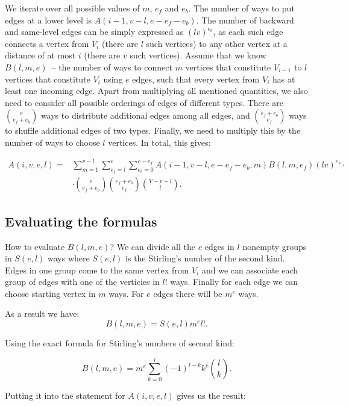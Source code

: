 \documentclass{llncs}
\begin{document}
  We iterate over all possible values of $m$, $e_f$ and $e_b$. The number of ways to put edges at a lower level
  is $A(i-1, v-l, e-e_f-e_b)$. The number of backward and same-level edges can be simply expressed as $(lv)^{e_b}$,
  as each such edge connects a vertex from $V_i$ (there are $l$ such vertices) to any other vertex at a distance of at 
  most $i$ (there are $v$ such vertices).
  Assume that we know $B(l,m,e)$~-- the number of ways to connect $m$ vertices that constitute $V_{i-1}$ to $l$ 
  vertices that constitute $V_i$ using $e$ edges, such that every vertex from $V_i$ has at least one incoming edge.
  Apart from multiplying all mentioned quantities, we also need to consider all possible orderings of edges of 
  different types. There are $\binom{e}{e_f + e_b}$ ways to distribute additional edges among all edges, and
  $\binom{e_f + e_b}{e_f}$ ways to shuffle additional edges of two types. Finally, we need to multiply this
  by the number of ways to choose $l$ vertices.
  In total, this gives:
  
  \begin{align*}
  A(i,v,e,l)  = & \sum_{m = 1}^{v - l} \sum_{e_f = l}^{e} \sum_{e_b = 0}^{e - e_f} A(i - 1, v - l, e - e_f - e_b, m) B(l, m, e_f) (l v)^{e_b} \cdot \\ 
  & \cdot \binom{e}{e_f + e_b} \binom{e_f + e_b}{e_f} \binom{V - v + l}{l}.
  \end{align*} 
  
  \subsection{Evaluating the formulas}
  
  How to evaluate $B(l,m,e)$? We can divide all the $e$ edges in $l$ nonempty groups in $S(e, l)$ ways where $S(e, l)$ is the Stirling's number of the second kind. Edges in one group come to the same vertex from $V_i$ and we can associate each group of edges with one of the verticies in $l!$ ways. Finally for each edge we can choose starting vertex in $m$ ways. For $e$ edges there will be $m^e$ ways.
  
  As a result we have:
  $$B(l, m, e) = S(e, l) m^e l!.$$
  
  Using the exact formula for Stirling's numbers of second kind:
  
  $$B(l, m, e) = m^e \sum_{k = 0}^{l} (-1)^{l-k} k^e {l \choose k}.$$
  
  Putting it into the statement for $A(i, v, e, l)$ gives us the result:
  
\end{document}
